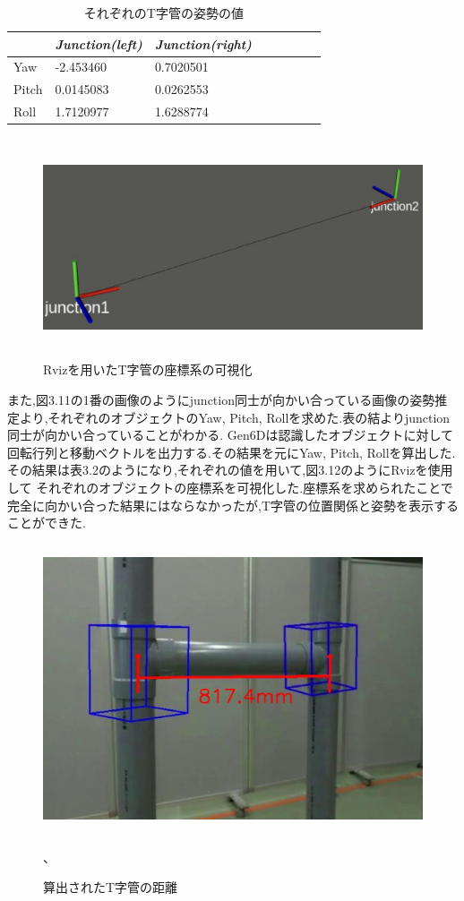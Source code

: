 \begin{table}[htbp]
\centering
\caption{それぞれのT字管の姿勢の値}
\begin{tabular}{llllllll}
\hline
\textit{\textbf{}} & \textit{Junction(left)} & \textit{Junction(right)} \\ \hline
Yaw         & -2.453460 &  0.7020501        \\
Pitch				&	0.0145083	 &	0.0262553			\\
Roll        & 1.7120977  & 1.6288774    \\
\end{tabular}%

\end{table}

\begin{figure}[htbt]
	\centering
	 \includegraphics[height=65mm]{rviz.eps}
	 \caption{Rvizを用いたT字管の座標系の可視化}
	 \label{fig:f2}
\end{figure}

また,図3.11の1番の画像のようにjunction同士が向かい合っている画像の姿勢推定より,それぞれのオブジェクトのYaw, Pitch, Rollを求めた.表の結よりjunction同士が向かい合っていることがわかる.
Gen6Dは認識したオブジェクトに対して回転行列と移動ベクトルを出力する.その結果を元にYaw, Pitch, Rollを算出した.その結果は表3.2のようになり,それぞれの値を用いて,図3.12のようにRvizを使用して
それぞれのオブジェクトの座標系を可視化した.座標系を求められたことで完全に向かい合った結果にはならなかったが,T字管の位置関係と姿勢を表示することができた.

\begin{figure}[htbt]
	\centering
	 \includegraphics[height=85mm]{scale.eps}
	 \caption{算出されたT字管の距離}、
	 \label{fig:f2}
\end{figure}

